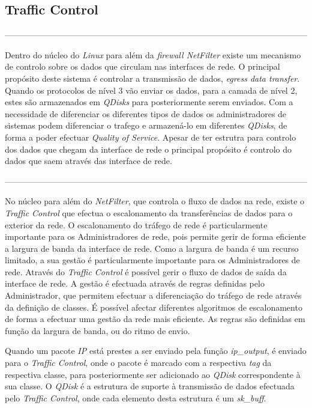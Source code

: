 \subsection{Traffic Control}

------------------------------------------------------------------------------------------------------------

 Dentro do núcleo do \textit{Linux} para além da \textit{firewall NetFilter} existe um mecanismo de controlo sobre os dados que circulam nas interfaces de rede.
 O principal propósito deste sistema é controlar a transmissão de dados, \textit{egress data transfer}.
 Quando os protocolos de nível 3 vão enviar os dados, para a camada de nível 2, estes são armazenados em \textit{QDisks} para posteriormente serem enviados.
 Com a necessidade de diferenciar os diferentes tipos de dados os administradores de sistemas podem diferenciar o trafego e armazená-lo em diferentes \textit{QDisks}, de forma a poder efectuar \textit{Quality of Service}.
Apesar de ter estrutra para controlo dos dados que chegam da interface de rede o principal propósito é controlo do dados que saem através das interface de rede.

------------------------------------------------------------------------------------------------------------

No núcleo para além do \textit{NetFilter}, que controla o fluxo de dados na rede, existe o \textit{Traffic Control} que efectua o escalonamento da transferências de dados para o exterior da rede.
O escalonamento do tráfego de rede é particularmente importante para os Administradores de rede, pois permite gerir de forma eficiente a largura de banda da interface de rede.
Como a largura de banda é um recurso limitado, a sua gestão é particularmente importante para os Administradores de rede.
Através do \textit{Traffic Control} é possível gerir o fluxo de dados de saída da interface de rede.
A gestão é efectuada através de regras definidas pelo Administrador, que permitem efectuar a diferenciação do tráfego de rede através da definição de classes.
É possível afectar diferentes algoritmos de escalonamento de forma a efectuar uma gestão da rede mais eficiente.
As regras são definidas em função da largura de banda, ou do ritmo de envio.

Quando um pacote \textit{IP} está prestes a ser enviado pela função \textit{ip\_output}, é enviado para o \textit{Traffic Control}, onde o pacote é marcado com a respectiva \textit{tag} da respectiva classe, para posteriormente ser adicionado ao \textit{QDisk} correspondente à sua classe.
O \textit{QDisk} é a estrutura de suporte à transmissão de dados efectuada pelo \textit{Traffic Control}, onde cada elemento desta estrutura é um \textit{sk\_buff}.



